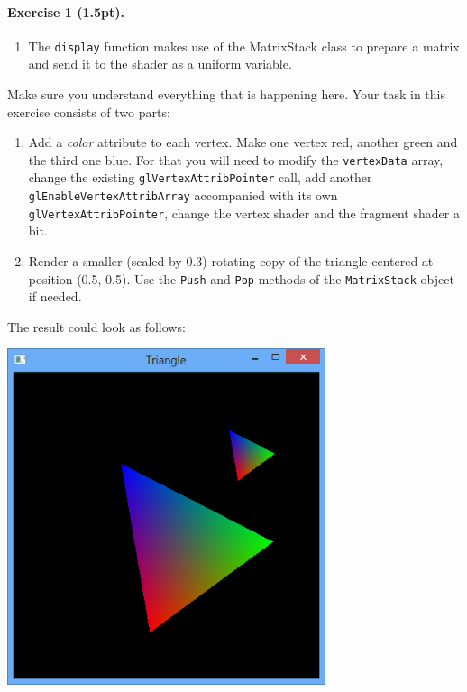 \documentclass{article}
\newenvironment{exercise}[2]{\paragraph{Exercise #1 (#2pt).} }{
\medskip}
\begin{document}
\begin{exercise}{1}{1.5}
\begin{enumerate}
\item The \texttt{display} function makes use of the MatrixStack class to prepare a matrix and send it to the shader as a uniform variable.
\end{enumerate}
Make sure you understand everything that is happening here. Your task in this exercise consists of two parts:
\begin{enumerate}
\item Add a \emph{color} attribute to each vertex. Make one vertex red, another green and the third one blue. For that you will need to modify the \texttt{vertexData} array, change the existing \texttt{glVertexAttribPointer} call, add another \texttt{glEnableVertexAttribArray} accompanied with its own\\ \texttt{glVertexAttribPointer}, change the vertex shader and the fragment shader a bit.
\item Render a smaller (scaled by 0.3) rotating copy of the triangle centered at position (0.5, 0.5). Use the \texttt{Push} and \texttt{Pop} methods of the \texttt{MatrixStack} object if needed.
\end{enumerate}

The result could look as follows:
\begin{center}
\includegraphics[width=0.7\textwidth]{newtriangle.png}
\end{center}
\end{exercise}
\end{document}
